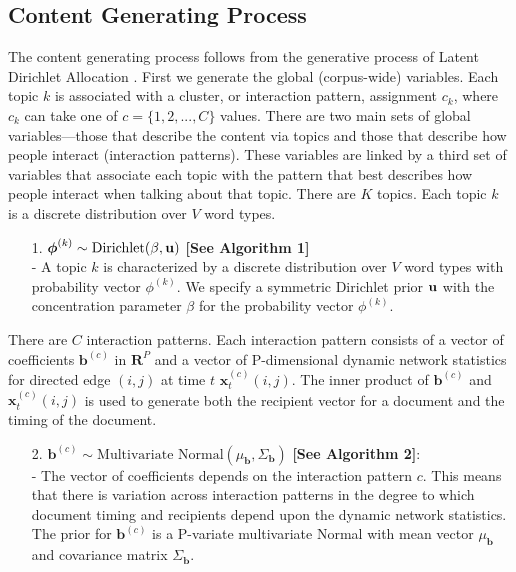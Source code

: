 \documentclass[a4paper]{article}
\begin{document}
\subsection{Content Generating Process} \label{subsec: Content Generating Process} 
The content generating process follows from the generative process of Latent Dirichlet Allocation \cite{Blei2003}. First we generate the global (corpus-wide) variables. Each topic $k$ is associated with a cluster, or interaction pattern, assignment $c_k$, where $c_k$ can take one of $c = \{1,2,...,C\}$ values.  There are two main sets of global variables---those that describe the content via topics and those that describe how people interact (interaction patterns). These variables are linked by a third set of variables that associate each topic with the pattern that best describes how people interact when talking about that topic. \newline
There are $K$ topics. Each topic $k$ is a discrete distribution over $V$ word types.
\begin{itemize}
	\item[1.] {$\boldsymbol{\phi}^{(k)} \sim \mbox{Dirichlet}(\beta, \bf u)$} \textbf{[See Algorithm 1]}\\
	- A topic $k$ is characterized by a discrete distribution over $V$ word types with probability vector $\phi^{(k)}$. We specify a symmetric Dirichlet prior $\bf u$ with the concentration parameter $\beta$ for the probability vector $\phi^{(k)}$.
\end{itemize}
\noindent There are $C$ interaction patterns. Each interaction pattern consists of a vector of coefficients $\boldsymbol{b}^{(c)}$ in $\boldsymbol{R}^{P}$ and a vector of P-dimensional dynamic network statistics for directed edge $(i, j)$ at time $t$ $\boldsymbol{x}^{(c)}_t(i, j)$. The inner product of $\boldsymbol{b}^{(c)}$ and $\boldsymbol{x}^{(c)}_t(i, j)$ is used to generate both the recipient vector for a document and the timing of the document.
\begin{itemize}
	\item[2.] $\boldsymbol{b}^{(c)}\sim \mbox{Multivariate Normal}(\mu_{\boldsymbol{b}}, \Sigma_{\boldsymbol{b}})$ \textbf{[See Algorithm 2]}: \\
		- The vector of coefficients depends on the interaction pattern $c$. This means that there is variation across interaction patterns in the degree to which document timing and recipients depend upon the dynamic network statistics. The prior for $\boldsymbol{b}^{(c)}$ is a P-variate multivariate Normal with mean vector $\mu_{\boldsymbol{b}}$ and covariance matrix $\Sigma_{\boldsymbol{b}}$.
	\end{itemize}
\end{document}

